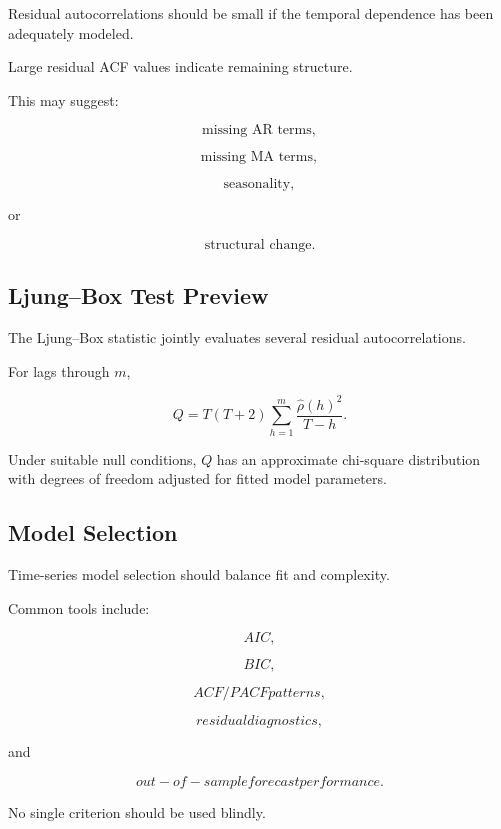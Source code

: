 Residual autocorrelations should be small if the temporal dependence has
been adequately modeled.

Large residual ACF values indicate remaining structure.

This may suggest:

\[
\boxed{
\text{missing AR terms},
}
\]

\[
\boxed{
\text{missing MA terms},
}
\]

\[
\boxed{
\text{seasonality},
}
\]

or

\[
\boxed{
\text{structural change}.
}
\]

\subsection{Ljung--Box Test Preview}
\label{subsec:ljung-box-preview}

The Ljung--Box statistic jointly evaluates several residual
autocorrelations.

For lags through \(m\),

\[
\boxed{
Q
=
T(T+2)
\sum_{h=1}^{m}
\frac{
\widehat{\rho}(h)^2
}{
T-h
}.
}
\]

Under suitable null conditions, \(Q\) has an approximate chi-square
distribution with degrees of freedom adjusted for fitted model
parameters.

\subsection{Model Selection}
\label{subsec:time-series-model-selection}

Time-series model selection should balance fit and complexity.

Common tools include:

\[
\boxed{
AIC,
}
\]

\[
\boxed{
BIC,
}
\]

\[
\boxed{
ACF/PACF patterns,
}
\]

\[
\boxed{
residual diagnostics,
}
\]

and

\[
\boxed{
out-of-sample forecast performance.
}
\]

No single criterion should be used blindly.

